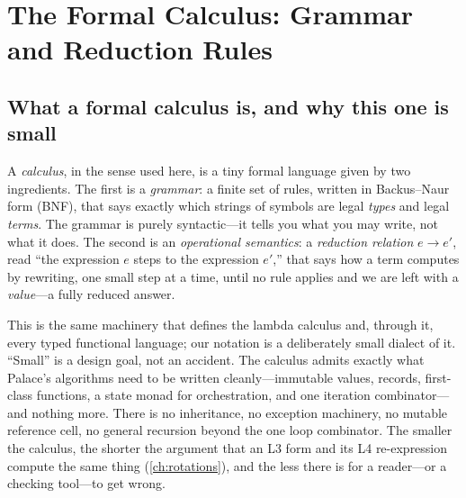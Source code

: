 \chapter{The Formal Calculus: Grammar and Reduction Rules}
\label{app:calculus}


\section{What a formal calculus is, and why this one is small}
\label{app:calc:orient}

A \emph{calculus}, in the sense used here, is a tiny formal language given by two
ingredients. The first is a \emph{grammar}: a finite set of rules, written in
Backus--Naur form (BNF), that says exactly which strings of symbols are legal
\emph{types} and legal \emph{terms}. The grammar is purely syntactic---it tells
you what you may write, not what it does. The second is an \emph{operational
semantics}: a \emph{reduction relation} $e \to e'$, read ``the expression $e$
steps to the expression $e'$,'' that says how a term computes by rewriting,
one small step at a time, until no rule applies and we are left with a
\emph{value}---a fully reduced answer.

This is the same machinery that defines the lambda calculus and, through it, every
typed functional language; our notation is a deliberately small dialect of it.
``Small'' is a design goal, not an accident. The calculus admits exactly what
Palace's algorithms need to be written cleanly---immutable values, records,
first-class functions, a state monad for orchestration, and one iteration
combinator---and nothing more. There is no inheritance, no exception machinery,
no mutable reference cell, no general recursion beyond the one loop combinator.
The smaller the calculus, the shorter the argument that an L3 form and its L4
re-expression compute the same thing (\cref{ch:rotations}), and the less there is
for a reader---or a checking tool---to get wrong.

